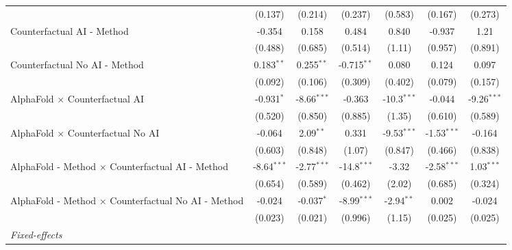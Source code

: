 \begin{tabular}{lcccccc}
                                                              & (0.137)       & (0.214)       & (0.237)       & (0.583)       & (0.167)       & (0.273)\\   
   Counterfactual AI - Method                                 & -0.354        & 0.158         & 0.484         & 0.840         & -0.937        & 1.21\\   
                                                              & (0.488)       & (0.685)       & (0.514)       & (1.11)        & (0.957)       & (0.891)\\   
   Counterfactual No AI - Method                              & 0.183$^{**}$  & 0.255$^{**}$  & -0.715$^{**}$ & 0.080         & 0.124         & 0.097\\   
                                                              & (0.092)       & (0.106)       & (0.309)       & (0.402)       & (0.079)       & (0.157)\\   
   AlphaFold $\times$ Counterfactual AI                       & -0.931$^{*}$  & -8.66$^{***}$ & -0.363        & -10.3$^{***}$ & -0.044        & -9.26$^{***}$\\   
                                                              & (0.520)       & (0.850)       & (0.885)       & (1.35)        & (0.610)       & (0.589)\\   
   AlphaFold $\times$ Counterfactual No AI                    & -0.064        & 2.09$^{**}$   & 0.331         & -9.53$^{***}$ & -1.53$^{***}$ & -0.164\\   
                                                              & (0.603)       & (0.848)       & (1.07)        & (0.847)       & (0.466)       & (0.838)\\   
   AlphaFold - Method $\times$ Counterfactual AI - Method     & -8.64$^{***}$ & -2.77$^{***}$ & -14.8$^{***}$ & -3.32         & -2.58$^{***}$ & 1.03$^{***}$\\   
                                                              & (0.654)       & (0.589)       & (0.462)       & (2.02)        & (0.685)       & (0.324)\\   
   AlphaFold - Method $\times$ Counterfactual No AI - Method  & -0.024        & -0.037$^{*}$  & -8.99$^{***}$ & -2.94$^{**}$  & 0.002         & -0.024\\   
                                                              & (0.023)       & (0.021)       & (0.996)       & (1.15)        & (0.025)       & (0.025)\\   
   \midrule
   \emph{Fixed-effects}\\

\end{tabular}
